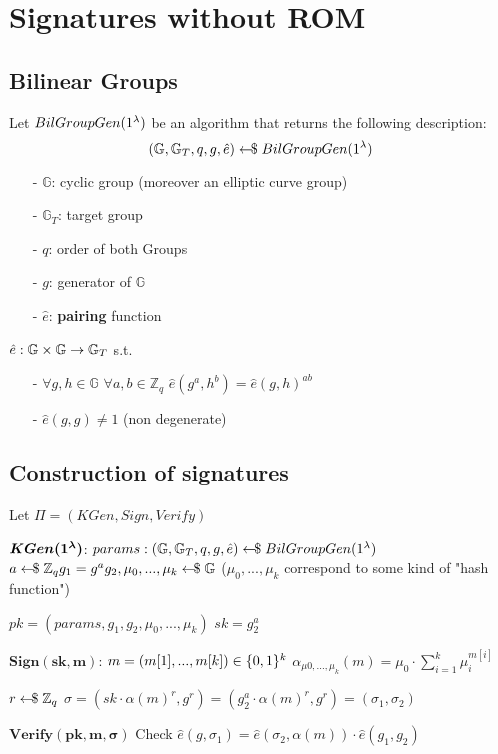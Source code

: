 \chapter{Signatures without ROM}

\section{Bilinear Groups}
Let $BilGroupGen(1^\lambda)$ be an algorithm that returns the following description:
\[ (\mathbb{G}, \mathbb{G}_T, q, g, \hat{e}) \leftarrow\kern-0.42em{\$} \; BilGroupGen(1^\lambda) \]
\begin{itemize}
    \item[-] $\mathbb{G}$: cyclic group (moreover an elliptic curve group)
    \item[-] $\mathbb{G}_T$: target group
    \item[-] $q$: order of both Groups
    \item[-] $g$: generator of $\mathbb{G}$
    \item[-] $\hat{e}$: \textbf{pairing} function  
\end{itemize}

$\hat{e} : \mathbb{G} \times \mathbb{G} \rightarrow \mathbb{G}_T$ s.t.
\begin{itemize}
    \item[-] $\forall g,h \in \mathbb{G}$ $\forall a,b \in \mathbb{Z}_q$ $\hat{e}(g^a, h^b) = \hat{e}(g,h)^{ab}$
    \item[-] $\hat{e}(g,g) \neq 1$ (non degenerate)
\end{itemize}


\section{Construction of signatures}
Let $\Pi = (KGen, Sign, Verify)$

$\boldsymbol{KGen(1^\lambda)}$:\newline
$params: (\mathbb{G}, \mathbb{G}_T, q, g, \hat{e}) \leftarrow\kern-0.42em{\$} \; BilGroupGen(1^\lambda)$\newline
$\unisample{a}{\mathbb{Z}_q}\newline g_1 = g^a\newline \unisample{g_2,\mu_0,...,\mu_k}{\mathbb{G}}$ ($\mu_0,...,\mu_k$ correspond to some kind of "hash function")

$pk = (params, g_1, g_2, \mu_0, ..., \mu_k)$\newline
$sk = g_2^a$

$\boldsymbol{Sign(sk,m)}$:\newline
$m = (m[1], ..., m[k]) \in \{0,1\}^k$\newline
$\alpha_{\mu0, ..., \mu_k}(m) = \mu_0 \cdot \sum_{i=1}^k \mu_i^{m[i]}$

$r \leftarrow\kern-0.42em{\$} \; \mathbb{Z}_q$\newline
$\sigma = (sk \cdot \alpha(m)^r, g^r) = (g_2^a \cdot \alpha(m)^r, g^r) = (\sigma_1, \sigma_2)$

$\boldsymbol{Verify(pk,m,\sigma)}$\newline
Check $\hat{e}(g,\sigma_1) = \hat{e}(\sigma_2, \alpha(m)) \cdot \hat{e}(g_1,g_2)$